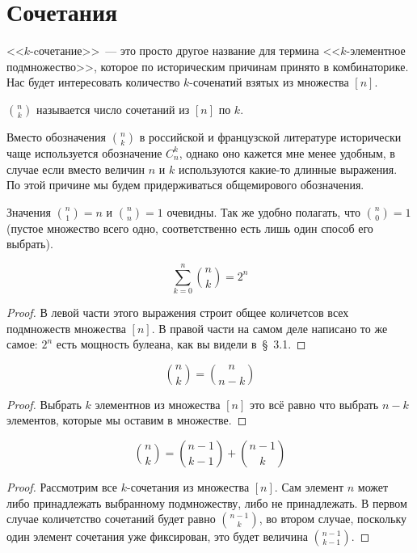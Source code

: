 \section{Сочетания}

<<$k$-cочетание>>~--- это просто другое название для термина <<$k$-элементное подмножество>>, которое по историческим причинам принято в комбинаторике. Нас будет интересовать количество $k$-соченатий взятых из множества $[n]$.

\begin{definition}
 $n \choose k$ называется число сочетаний из $[n]$ по $k$.
\end{definition}

Вместо обозначения ${n \choose k}$ в российской и французской литературе исторически чаще используется обозначение $C^k_n$, однако оно кажется мне менее удобным, в случае если вместо величин $n$ и $k$ используются какие-то длинные выражения. По этой причине мы будем придерживаться общемирового обозначения.

Значения ${n \choose 1} = n$ и ${n \choose n} = 1$ очевидны. Так же удобно полагать, что ${n \choose 0} =1$ (пустое множество всего одно, соответственно есть лишь один способ его выбрать). 

\begin{thm}
$$\sum_{k=0}^n{n \choose k} = 2^n$$
\end{thm}
\begin{proof}
В левой части этого выражения строит общее количетсов всех подмножеств множества $[n]$. В правой части на самом деле написано то же самое: $2^n$ есть мощность булеана, как вы видели в~\S~3.1.
\end{proof}

\begin{thm}
$${n \choose k} = {n \choose n-k}$$
\end{thm}
\begin{proof}
Выбрать $k$ элементнов из множества $[n]$ это всё равно что выбрать $n-k$ элементов, которые мы оставим в множестве.
\end{proof}

\begin{thm}
$${n \choose k} = {n-1 \choose k-1} + {n - 1 \choose k}$$
\end{thm}

\begin{proof}
Рассмотрим все $k$-сочетания из множества $[n]$. Сам элемент $n$ может либо принадлежать выбранному подмножеству, либо не принадлежать. В первом случае количетство сочетаний будет равно $n-1\choose k$, во втором случае, поскольку один элемент сочетания уже фиксирован, это будет величина $n-1\choose k - 1$.
\end{proof}

